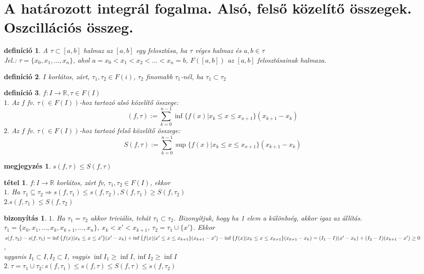 \documentclass{article}
\newcommand{\fir}{f\colon I\rightarrow\mathbb{R}}
\newcommand{\nn}{\Rightarrow}
\newcommand{\di}{\displaystyle}
\theoremstyle{magyar}
\newtheorem{de}{definíció}[section]
\newtheorem{te}{tétel}[section]
\newtheorem{bi}{bizonyítás}[section]
\newtheorem{me}{megjegyzés}[section]
\begin{document}
  \section{A határozott integrál fogalma. Alsó, felső közelítő összegek. Oszcillációs összeg.}
  \begin{de}
    A $\tau\subset[a,b]$ halmaz az $[a,b]$ egy felosztása, ha $\tau$ véges halmaz és $a,b\in\tau$\\
    Jel.: $\tau=\{x_0,x_1,\ldots,x_n\}$, ahol $a=x_0<x_1<x_2<\ldots<x_n=b$, $F([a,b])$ az $[a,b]$ felosztásainak halmaza.
  \end{de}
  \begin{de}
    $I$ korlátos, zárt, $\tau_1,\tau_2\in{F(i)}$, $\tau_2$ finomabb $\tau_1$-nél, ha $\tau_1\subset\tau_2$\\
  \end{de}
  \begin{de}
  $\fir,\tau\in{F(I)}$\\
  $1.$ Az $f$ fv. $\tau(\in{F(I)})$-hoz tartozó alsó közelítő összege: \[(f,\tau):=\di\sum_{k=0}^{n-1}{\inf{\{f(x)|x_k\le{x}\le{x_{x+1}}\}}(x_{k+1}-x_k)}\]
  $2.$ Az $f$ fv. $\tau(\in{F(I)})$-hoz tartozó felső közelítő összege: \[S(f,\tau):=\di\sum_{k=0}^{n-1}{\sup{\{f(x)|x_k\le{x}\le{x_{x+1}}\}}(x_{k+1}-x_k)}\]
  \end{de}
  \begin{me}
    $s(f,\tau)\le S(f,\tau)$
  \end{me}
  \begin{te}
    $\fir$ korlátos, zárt fv, $\tau_1,\tau_2\in F(I)$, ekkor\\
    $1.$ Ha $\tau_1\subseteq\tau_2\nn{s(f,\tau_1)}\le{s(f,\tau_2)},{S(f,\tau_1)}\ge{S(f,\tau_2)}$\\
    $2. s(f,\tau_1)\le{S(f,\tau_2)}$
  \end{te}
  \begin{bi}
    $1.$ Ha $\tau_1=\tau_2$ akkor triviális, tehát $\tau_1\subset\tau_2$. Bizonyítjuk, hogy ha 1 elem a különbség, akkor igaz az állítás. $\tau_1=\{x_0,x_1,\ldots,x_k,x_{k+1},\ldots,x_n\}$, $x_k<x'<x_{k+1}$, $\tau_2=\tau_1\cup{\{x'\}}$. 
    Ekkor $\\s(f,\tau_2)-s(f,\tau_1)=\inf{\{f(x)|x_k\le{x}\le{x'}\}}(x'-x_k)+\inf{\{f(x)|x'\le{x}\le{x_{k+1}}\}}(x_{k+1}-x')-\inf{\{f(x)|x_k\le{x}\le{x_{k+1}}\}}(x_{k+1}-x_k)=(I_1-I)(x'-x_k)+(I_2-I)(x_{k+1}-x')\ge0$,\\ ugyanis $I_1\subset{I},I_2\subset{I}$, vagyis $\inf{I_1}\ge\inf{I},\inf{I_2}\ge\inf{I}$\\
    $2.\ \tau=\tau_1\cup\tau_2: s(f,\tau_1)\le{s(f,\tau)}\le{S(f,\tau)}\le{s(f,\tau_2)}$
  \end{bi}
\end{document}
